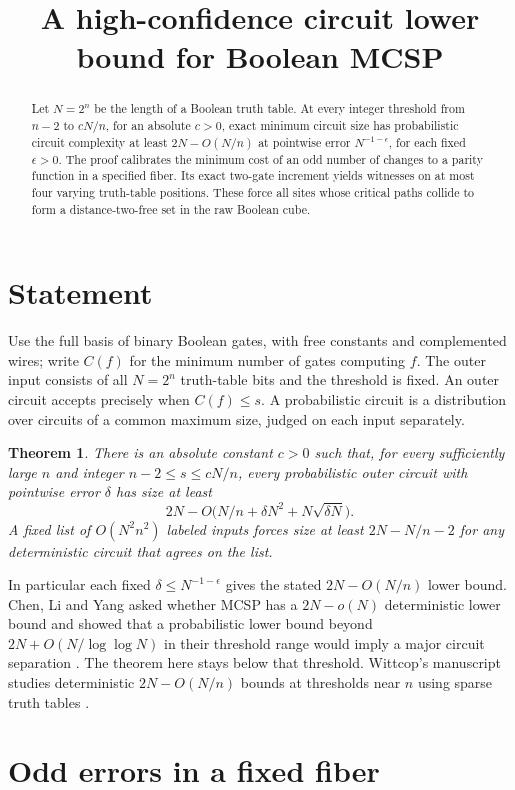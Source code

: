 \documentclass[11pt]{article}
\title{A high-confidence circuit lower bound for Boolean MCSP}
\author{}
\date{}
\newtheorem{theorem}{Theorem}
\begin{document}
\maketitle
\begin{abstract}
Let \(N=2^n\) be the length of a Boolean truth table. At every integer threshold from \(n-2\) to \(cN/n\), for an absolute \(c>0\), exact minimum circuit size has probabilistic circuit complexity at least \(2N-O(N/n)\) at pointwise error \(N^{-1-\epsilon}\), for each fixed \(\epsilon>0\). The proof calibrates the minimum cost of an odd number of changes to a parity function in a specified fiber. Its exact two-gate increment yields witnesses on at most four varying truth-table positions. These force all sites whose critical paths collide to form a distance-two-free set in the raw Boolean cube.
\end{abstract}
\section{Statement}
Use the full basis of binary Boolean gates, with free constants and complemented wires; write \(C(f)\) for the minimum number of gates computing \(f\). The outer input consists of all \(N=2^n\) truth-table bits and the threshold is fixed. An outer circuit accepts precisely when \(C(f)\le s\). A probabilistic circuit is a distribution over circuits of a common maximum size, judged on each input separately.
\begin{theorem}
There is an absolute constant \(c>0\) such that, for every sufficiently large \(n\) and integer \(n-2\le s\le cN/n\), every probabilistic outer circuit with pointwise error \(\delta\) has size at least
\[
 2N-O\bigl(N/n+\delta N^2+N\sqrt{\delta N}\bigr).
\]
A fixed list of \(O(N^2n^2)\) labeled inputs forces size at least \(2N-N/n-2\) for any deterministic circuit that agrees on the list.
\end{theorem}
In particular each fixed \(\delta\le N^{-1-\epsilon}\) gives the stated \(2N-O(N/n)\) lower bound. Chen, Li and Yang asked whether MCSP has a \(2N-o(N)\) deterministic lower bound and showed that a probabilistic lower bound beyond \(2N+O(N/\log\log N)\) in their threshold range would imply a major circuit separation \cite[Theorem~1.6]{cly}. The theorem here stays below that threshold. Wittcop's manuscript studies deterministic \(2N-O(N/n)\) bounds at thresholds near \(n\) using sparse truth tables \cite{wittcop}.
\section{Odd errors in a fixed fiber}
\end{document}
